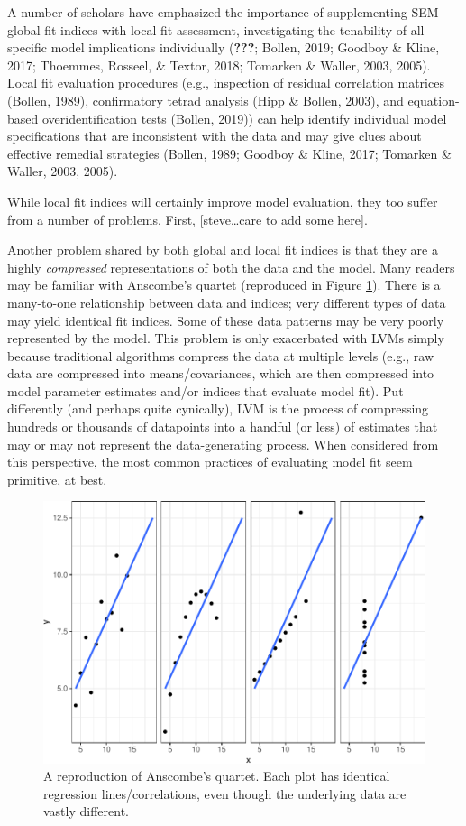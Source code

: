 \documentclass[
  english,
  doc]{apa6}
\begin{document}
A number of scholars have emphasized the importance of supplementing SEM global fit indices with local fit assessment, investigating the tenability of all specific model implications individually ({\textbf{???}}; Bollen, 2019; Goodboy \& Kline, 2017; Thoemmes, Rosseel, \& Textor, 2018; Tomarken \& Waller, 2003, 2005). Local fit evaluation procedures (e.g., inspection of residual correlation matrices (Bollen, 1989), confirmatory tetrad analysis (Hipp \& Bollen, 2003), and equation-based overidentification tests (Bollen, 2019)) can help identify individual model specifications that are inconsistent with the data and may give clues about effective remedial strategies (Bollen, 1989; Goodboy \& Kline, 2017; Tomarken \& Waller, 2003, 2005).

While local fit indices will certainly improve model evaluation, they too suffer from a number of problems. First, {[}steve\ldots care to add some here{]}.

Another problem shared by both global and local fit indices is that they are a highly \emph{compressed} representations of both the data and the model. Many readers may be familiar with Anscombe's quartet (reproduced in Figure \ref{fig:anscombe}). There is a many-to-one relationship between data and indices; very different types of data may yield identical fit indices. Some of these data patterns may be very poorly represented by the model. This problem is only exacerbated with LVMs simply because traditional algorithms compress the data at multiple levels (e.g., raw data are compressed into means/covariances, which are then compressed into model parameter estimates and/or indices that evaluate model fit). Put differently (and perhaps quite cynically), LVM is the process of compressing hundreds or thousands of datapoints into a handful (or less) of estimates that may or may not represent the data-generating process. When considered from this perspective, the most common practices of evaluating model fit seem primitive, at best.

\begin{figure}
\centering
\includegraphics{flexplavaan_draft_files/figure-latex/anscombe-1.pdf}
\caption{\label{fig:anscombe}A reproduction of Anscombe's quartet. Each plot has identical regression lines/correlations, even though the underlying data are vastly different.}
\end{figure}
\end{document}
